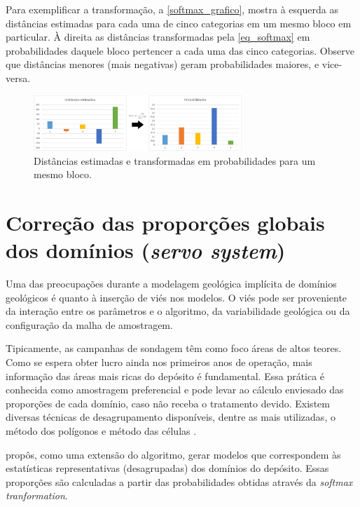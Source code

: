 Para exemplificar a transformação, a \autoref{softmax_grafico}, mostra à esquerda as distâncias estimadas para cada uma de cinco categorias em um mesmo bloco em particular. À direita as distâncias transformadas pela \autoref{eq_softmax} em probabilidades daquele bloco pertencer a cada uma das cinco categorias. Observe que distâncias menores (mais negativas) geram probabilidades maiores, e vice-versa.  

\begin{figure}[!ht]
	\caption{\label{softmax_grafico}Distâncias estimadas e transformadas em probabilidades para um mesmo bloco.}
	\begin{center}
		\includegraphics[width=0.7\textwidth]{modelagem_geologica/softmax_bars_final}
	\end{center}
\end{figure}

\section{Correção das proporções globais dos domínios (\textit{servo system})}\label{servo_chap}

Uma das preocupações durante a modelagem geológica implícita de domínios geológicos é quanto à inserção de viés nos modelos. O viés pode ser proveniente da interação entre os parâmetros e o algoritmo, da variabilidade geológica ou da configuração da malha de amostragem.

Tipicamente, as campanhas de sondagem têm como foco áreas de altos teores. Como se espera obter lucro ainda nos primeiros anos de operação, mais informação das áreas mais ricas do depósito é fundamental. Essa prática é conhecida como amostragem preferencial e pode levar ao cálculo enviesado das proporções de cada domínio, caso não receba o tratamento devido. Existem diversas técnicas de desagrupamento disponíveis, dentre as mais utilizadas, o método dos polígonos e método das células \cite{maureira}.

 propôs, como uma extensão do algoritmo, gerar modelos que correspondem às estatísticas representativas (desagrupadas) dos domínios do depósito. Essas proporções são calculadas a partir das probabilidades obtidas através da \textit{softmax tranformation}.

